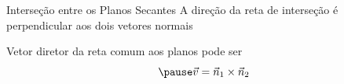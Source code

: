 \documentclass[fleqn,aspectratio=169,12pt]{beamer}
\begin{document}
 \begin{frame}{Interseção entre os Planos Secantes}
  A direção da reta de interseção é perpendicular aos dois vetores normais

  \pause
  \bigskip
  Vetor diretor da reta comum aos planos pode ser
  \[
    \pause
    \vec{v} = \vec{n}_1\times\vec{n}_2
  \]
\end{frame}





%
%

\end{document}
